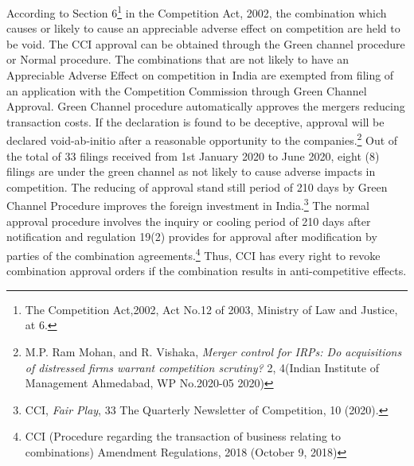 \begin{multicols}{2}
\noi
According to Section 6\footnote{The Competition Act,2002, Act No.12 of 2003, Ministry of Law and Justice, at 6.} in the Competition Act, 2002, the combination which causes or
likely to cause an appreciable adverse effect on competition are held to be void. The CCI
approval can be obtained through the Green channel procedure or Normal procedure. The
combinations that are not likely to have an Appreciable Adverse Effect on competition in
India are exempted from filing of an application with the Competition Commission through
Green Channel Approval. Green Channel procedure automatically approves the mergers
reducing transaction costs. If the declaration is found to be deceptive, approval will be
declared void-ab-initio after a reasonable opportunity to the companies.\footnote{M.P. Ram Mohan, and R. Vishaka, \textit{Merger control for IRPs: Do acquisitions of distressed firms warrant
competition scrutiny?} 2, 4(Indian Institute of Management Ahmedabad, WP No.2020-05 2020)} Out of the total of
33 filings received from 1st January 2020 to June 2020, eight (8) filings are under the green
channel as not likely to cause adverse impacts in competition. The reducing of approval stand
still period of 210 days by Green Channel Procedure improves the foreign investment in
India.\footnote{CCI, \textit{Fair Play}, 33 The Quarterly Newsletter of Competition, 10 (2020).} The normal approval procedure involves the inquiry or cooling period of 210 days
after notification and regulation 19(2) provides for approval after modification by parties of
the combination agreements.\footnote{CCI (Procedure regarding the transaction of business relating to combinations) Amendment Regulations,
2018 (October 9, 2018)} Thus, CCI has every right to revoke combination approval
orders if the combination results in anti-competitive effects.

\vspace{.2cm}



\end{multicols}

